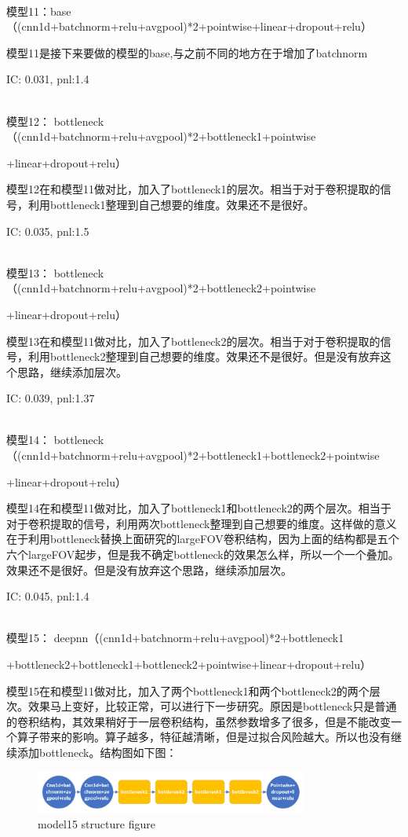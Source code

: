 \documentclass[11pt]{ctexart}
\begin{document}
~\\
模型11：base（(cnn1d+batchnorm+relu+avgpool)*2+pointwise+linear+dropout+relu）

模型11是接下来要做的模型的base,与之前不同的地方在于增加了batchnorm

{\kaishu \small IC: 0.031, pnl:1.4}

~\\
模型12： bottleneck（(cnn1d+batchnorm+relu+avgpool)*2+bottleneck1+pointwise

+linear+dropout+relu）

模型12在和模型11做对比，加入了bottleneck1的层次。相当于对于卷积提取的信号，利用bottleneck1整理到自己想要的维度。效果还不是很好。

{\kaishu \small IC: 0.035, pnl:1.5}

~\\
模型13： bottleneck（(cnn1d+batchnorm+relu+avgpool)*2+bottleneck2+pointwise

+linear+dropout+relu）

模型13在和模型11做对比，加入了bottleneck2的层次。相当于对于卷积提取的信号，利用bottleneck2整理到自己想要的维度。效果还不是很好。但是没有放弃这个思路，继续添加层次。

{\kaishu \small IC: 0.039, pnl:1.37}

~\\
模型14： bottleneck（(cnn1d+batchnorm+relu+avgpool)*2+bottleneck1+bottleneck2+pointwise

+linear+dropout+relu）

模型14在和模型11做对比，加入了bottleneck1和bottleneck2的两个层次。相当于对于卷积提取的信号，利用两次bottleneck整理到自己想要的维度。这样做的意义在于利用bottleneck替换上面研究的largeFOV卷积结构，因为上面的结构都是五个六个largeFOV起步，但是我不确定bottleneck的效果怎么样，所以一个一个叠加。效果还不是很好。但是没有放弃这个思路，继续添加层次。

{\kaishu \small IC: 0.045, pnl:1.4}

~\\
模型15： deepnn（(cnn1d+batchnorm+relu+avgpool)*2+bottleneck1

+bottleneck2+bottleneck1+bottleneck2+pointwise+linear+dropout+relu）

模型15在和模型11做对比，加入了两个bottleneck1和两个bottleneck2的两个层次。效果马上变好，比较正常，可以进行下一步研究。原因是bottleneck只是普通的卷积结构，其效果稍好于一层卷积结构，虽然参数增多了很多，但是不能改变一个算子带来的影响。算子越多，特征越清晰，但是过拟合风险越大。所以也没有继续添加bottleneck。结构图如下图：
\begin{figure}[H]
\begin{center}
\includegraphics[width=0.8\textwidth]{str8.PNG}
\end{center}
\caption{model15 structure figure}
\label{FIG.8}
\end{figure}
\end{document}
